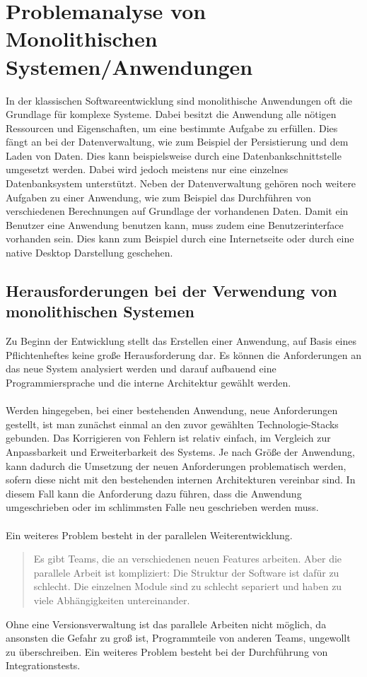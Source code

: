 \chapter{Problemanalyse von Monolithischen Systemen/Anwendungen}
\label{chap:ProblemanalyseMonolithischeSysteme}
In der klassischen Softwareentwicklung sind monolithische Anwendungen oft die Grundlage für komplexe Systeme. Dabei besitzt die Anwendung alle nötigen Ressourcen und Eigenschaften, um eine bestimmte Aufgabe zu erfüllen. Dies fängt an bei der Datenverwaltung, wie zum Beispiel der Persistierung und dem Laden von Daten. Dies kann beispielsweise durch eine Datenbankschnittstelle umgesetzt werden. Dabei wird jedoch meistens nur eine einzelnes Datenbanksystem unterstützt. Neben der Datenverwaltung gehören noch weitere Aufgaben zu einer Anwendung, wie zum Beispiel das Durchführen von verschiedenen Berechnungen auf Grundlage der vorhandenen Daten. Damit ein Benutzer eine Anwendung benutzen kann, muss zudem eine Benutzerinterface vorhanden sein. Dies kann zum Beispiel durch eine Internetseite  oder durch eine native Desktop Darstellung geschehen.

\section{Herausforderungen bei der Verwendung von monolithischen Systemen}
\label{sec:HerausforderungenMonolithisch}
Zu Beginn der Entwicklung stellt das Erstellen einer Anwendung, auf Basis eines Pflichtenheftes keine große Herausforderung dar. Es können die Anforderungen an das neue System analysiert werden und darauf aufbauend eine Programmiersprache und die interne Architektur gewählt werden.
\\\\
Werden hingegeben, bei einer bestehenden Anwendung, neue Anforderungen gestellt, ist man zunächst einmal an den zuvor gewählten Technologie-Stacks gebunden. Das Korrigieren von Fehlern ist relativ einfach, im Vergleich zur Anpassbarkeit und Erweiterbarkeit des Systems. Je nach Größe der Anwendung, kann dadurch die Umsetzung der neuen Anforderungen problematisch werden, sofern diese nicht mit den bestehenden internen Architekturen vereinbar sind. In diesem Fall kann die Anforderung dazu führen, dass die Anwendung umgeschrieben oder im schlimmsten Falle neu geschrieben werden muss.
\\\\
Ein weiteres Problem besteht in der parallelen Weiterentwicklung.
\begin{quotation}
    \frqq Es gibt Teams, die an verschiedenen neuen Features arbeiten. Aber die parallele Arbeit ist kompliziert: Die Struktur der Software ist dafür zu schlecht. Die einzelnen Module sind zu schlecht separiert und haben zu viele Abhängigkeiten untereinander. \flqq\ \cite[S. 16]{EWolff2016:Microservices}
\end{quotation}
Ohne eine Versionsverwaltung ist das parallele Arbeiten nicht möglich, da ansonsten die Gefahr zu groß ist, Programmteile von anderen Teams, ungewollt zu überschreiben. Ein weiteres Problem besteht bei der Durchführung von Integrationstests.

